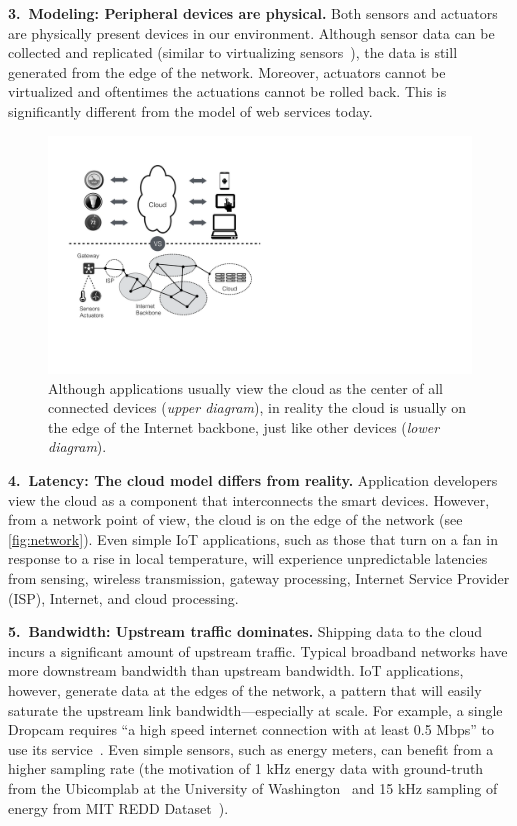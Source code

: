 \noindent\textbf{3.~Modeling: Peripheral devices are physical.}  Both sensors
and actuators are physically present devices in our environment.  Although
sensor data can be collected and replicated (similar to virtualizing
sensors~\cite{yuriyama2010sensor}), the data is still generated from the edge of
the network.  Moreover, actuators cannot be virtualized and oftentimes the
actuations cannot be rolled back.  This is significantly different from the
model of web services today.

\begin{figure}
  \centering
  \includegraphics[width=0.8\columnwidth]{figures/cloud-view.pdf}
  \caption{Although applications usually view the cloud as the center of
    all connected devices (\textit{upper diagram}), in reality the cloud
    is usually on the edge of the Internet backbone, just like other
    devices (\textit{lower diagram}).}
  \label{fig:network}
\end{figure}

\noindent\textbf{4.~Latency: The cloud model differs from reality.}  Application
developers view the cloud as a component that interconnects the smart
devices.  However, from a network point of view, the cloud is on
the edge of the network (see \autoref{fig:network}).  Even
simple IoT applications, such as those that turn on a fan in response to a
rise in local temperature, will experience unpredictable latencies from
sensing, wireless transmission, gateway processing, Internet Service Provider
(ISP), Internet, and cloud processing.


\noindent\textbf{5.~Bandwidth: Upstream traffic dominates.}  Shipping data to the
cloud incurs a significant amount of upstream traffic.  Typical broadband
networks have more downstream bandwidth than upstream bandwidth.  IoT
applications, however, generate data at the edges of the network, a pattern that
will easily saturate the upstream link bandwidth---especially at scale.  For
example, a single Dropcam requires ``a high speed internet connection with at
least 0.5 Mbps'' to use its service~\cite{dropcam}.  Even simple sensors, such
as energy meters, can benefit from a higher sampling rate (the motivation of 1
kHz energy data with ground-truth from the Ubicomplab at the University of
Washington~\cite{gupta2015household} and 15 kHz sampling of energy from MIT REDD
Dataset~\cite{kolter2011redd}).

